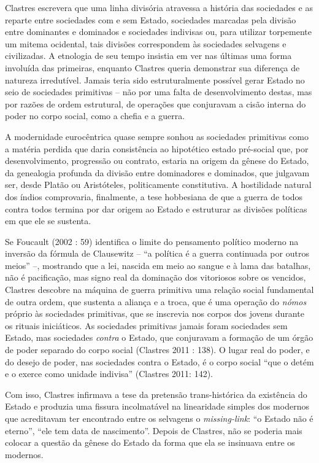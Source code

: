 Clastres escrevera que uma linha divisória atravessa a história das
sociedades e as reparte entre sociedades com e sem Estado, sociedades
marcadas pela divisão entre dominantes e dominados e sociedades
indivisas ou, para utilizar torpemente um mitema ocidental, tais
divisões correspondem às sociedades selvagens e civilizadas. A etnologia
de seu tempo insistia em ver nas últimas uma forma involuída das
primeiras, enquanto Clastres queria demonstrar sua diferença de natureza
irredutível. Jamais teria sido estruturalmente possível gerar Estado no
seio de sociedades primitivas -- não por uma falta de desenvolvimento
destas, mas por razões de ordem estrutural, de operações que conjuravam
a cisão interna do poder no corpo social, como a chefia e a guerra.

A modernidade eurocêntrica quase sempre sonhou as sociedades primitivas
como a matéria perdida que daria consistência ao hipotético estado
pré-social que, por desenvolvimento, progressão ou contrato, estaria na
origem da gênese do Estado, da genealogia profunda da divisão entre
dominadores e dominados, que julgavam ser, desde Platão ou Aristóteles,
politicamente constitutiva. A hostilidade natural dos índios
comprovaria, finalmente, a tese hobbesiana de que a guerra de todos
contra todos termina por dar origem ao Estado e estruturar as divisões
políticas em que ele se sustenta.

Se Foucault (2002 : 59) identifica o limite do pensamento político
moderno na inversão da fórmula de Clausewitz -- ``a política é a guerra
continuada por outros meios'' --, mostrando que a lei, nascida em meio
ao sangue e à lama das batalhas, não é pacificação, mas signo real da
dominação dos vitoriosos sobre os vencidos, Clastres descobre na máquina
de guerra primitiva uma relação social fundamental de outra ordem, que
sustenta a aliança e a troca, que é uma operação do \emph{nómos }próprio
às sociedades primitivas, que se inscrevia nos corpos dos jovens durante
os rituais iniciáticos. As sociedades primitivas jamais foram sociedades
sem Estado, mas sociedades \emph{contra }o Estado, que conjuravam a
formação de um órgão de poder separado do corpo social (Clastres 2011 :
138). O lugar real do poder, e do desejo de poder, nas sociedades contra
o Estado, é o corpo social ``que o detém e o exerce como unidade
indivisa'' (Clastres 2011: 142).

Com isso, Clastres infirmava a tese da pretensão trans-histórica da
existência do Estado e produzia uma fissura incolmatável na linearidade
simples dos modernos que acreditavam ter encontrado entre os selvagens o
\emph{missing-link}: ``o Estado não é eterno'', ``ele tem data de
nascimento''. Depois de Clastres, não se poderia mais colocar a questão
da gênese do Estado da forma que ela se insinuava entre os modernos.

